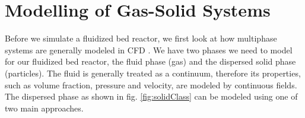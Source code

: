 






\section{Modelling of Gas-Solid Systems}
Before we simulate a fluidized bed reactor, we first look at how multiphase systems are generally modeled in CFD \cite{cfdComp}.
We have two phases we need to model for our fluidized bed reactor, the fluid phase (gas) and the dispersed solid phase (particles).
The fluid is generally treated as a continuum, therefore its properties, such as volume fraction, pressure and velocity, are modeled by continuous fields. 
The dispersed phase as shown in fig. \ref{fig:solidClass} can be modeled using one of two main approaches.
\FloatBarrier
